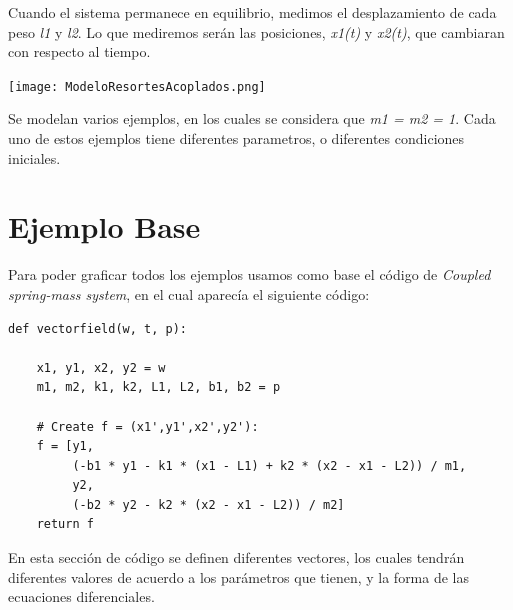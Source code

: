 \documentclass{article}
\begin{document}
\vspace{0.3cm}

Cuando el sistema permanece en equilibrio, medimos el desplazamiento de cada peso \textit{l1} y \textit{l2}. Lo que mediremos serán las posiciones, \textit{x1(t)} y \textit{x2(t)}, que cambiaran con respecto al tiempo.

\begin{center}
	\texttt{[image: ModeloResortesAcoplados.png]}
 
\end{center}
\vspace{0.3cm}

Se modelan varios ejemplos, en los cuales se considera que \textit{m1 = m2 = 1}. Cada uno de estos ejemplos tiene diferentes parametros, o diferentes condiciones iniciales.

\section{Ejemplo Base}

Para poder graficar todos los ejemplos usamos como base el código de \textit{Coupled spring-mass system}, en el cual aparecía el siguiente código:

\begin{verbatim}
def vectorfield(w, t, p):

    x1, y1, x2, y2 = w
    m1, m2, k1, k2, L1, L2, b1, b2 = p

    # Create f = (x1',y1',x2',y2'):
    f = [y1,
         (-b1 * y1 - k1 * (x1 - L1) + k2 * (x2 - x1 - L2)) / m1,
         y2,
         (-b2 * y2 - k2 * (x2 - x1 - L2)) / m2]
    return f
\end{verbatim}

En esta sección de código se definen diferentes vectores, los cuales tendrán diferentes valores de acuerdo a los parámetros que tienen, y la forma de las ecuaciones diferenciales.

\vspace{0.6cm}
\end{document}
